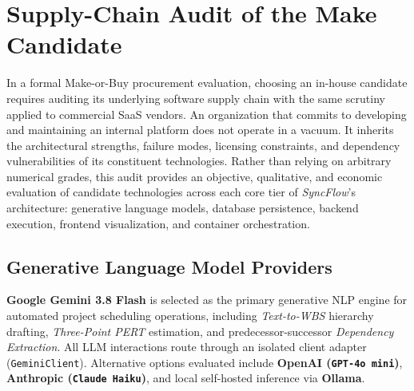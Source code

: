 \chapter{Supply-Chain Audit of the Make Candidate}
In a formal Make-or-Buy procurement evaluation, choosing an in-house candidate requires auditing its underlying software supply chain with the same scrutiny applied to commercial SaaS vendors. An organization that commits to developing and maintaining an internal platform does not operate in a vacuum. It inherits the architectural strengths, failure modes, licensing constraints, and dependency vulnerabilities of its constituent technologies. Rather than relying on arbitrary numerical grades, this audit provides an objective, qualitative, and economic evaluation of candidate technologies across each core tier of \textit{SyncFlow}'s architecture: generative language models, database persistence, backend execution, frontend visualization, and container orchestration.

\section{Generative Language Model Providers}
\textbf{Google Gemini 3.8 Flash} is selected as the primary generative NLP engine for automated project scheduling operations, including \textit{Text-to-WBS} hierarchy drafting, \textit{Three-Point PERT} estimation, and predecessor-successor \textit{Dependency Extraction}. All LLM interactions route through an isolated client adapter (\texttt{GeminiClient}). Alternative options evaluated include \textbf{OpenAI (\texttt{GPT-4o mini})}, \textbf{Anthropic (\texttt{Claude Haiku})}, and local self-hosted inference via \textbf{Ollama}.

